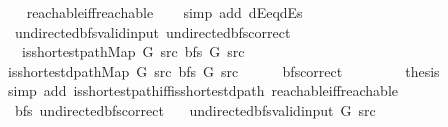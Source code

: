 \begin{isabellebody}
%
\isadelimproof
\ \ %
\endisadelimproof
%
\isatagproof
{}\isamarkupfalse%
\ reachable{\isacharunderscore}{\kern0pt}iff{\isacharunderscore}{\kern0pt}reachable\isanewline
\ \ \isamarkupfalse%
\ {\isacharparenleft}{\kern0pt}simp\ add{\isacharcolon}{\kern0pt}\ dE{\isacharunderscore}{\kern0pt}eq{\isacharunderscore}{\kern0pt}dEs{\isacharparenright}{\kern0pt}%
\endisatagproof
{\isafoldproof}%
%
\isadelimproof
\isanewline
%
\endisadelimproof
\isanewline
{}\isamarkupfalse%
\ {\isacharparenleft}{\kern0pt}\ undirected{\isacharunderscore}{\kern0pt}bfs{\isacharunderscore}{\kern0pt}valid{\isacharunderscore}{\kern0pt}input{\isacharparenright}{\kern0pt}\ undirected{\isacharunderscore}{\kern0pt}bfs{\isacharunderscore}{\kern0pt}correct{\isacharcolon}{\kern0pt}\isanewline
\ \ \ {\isachardoublequoteopen}is{\isacharunderscore}{\kern0pt}shortest{\isacharunderscore}{\kern0pt}path{\isacharunderscore}{\kern0pt}Map\ G\ src\ {\isacharparenleft}{\kern0pt}bfs\ G\ src{\isacharparenright}{\kern0pt}{\isachardoublequoteclose}\isanewline
%
\isadelimproof
%
\endisadelimproof
%
\isatagproof
{}\isamarkupfalse%
\ {\isacharminus}{\kern0pt}\isanewline
\ \ \isamarkupfalse%
\ {\isachardoublequoteopen}is{\isacharunderscore}{\kern0pt}shortest{\isacharunderscore}{\kern0pt}dpath{\isacharunderscore}{\kern0pt}Map\ G\ src\ {\isacharparenleft}{\kern0pt}bfs\ G\ src{\isacharparenright}{\kern0pt}{\isachardoublequoteclose}\isanewline
\ \ \ \ \isamarkupfalse%
\ bfs{\isacharunderscore}{\kern0pt}correct\isanewline
\ \ \ \ \isacommand{{\isachardot}{\kern0pt}}\isamarkupfalse%
\isanewline
\ \ \isamarkupfalse%
\ {\isacharquery}{\kern0pt}thesis\isanewline
\ \ \ \ \isamarkupfalse%
\ {\isacharparenleft}{\kern0pt}simp\ add{\isacharcolon}{\kern0pt}\ is{\isacharunderscore}{\kern0pt}shortest{\isacharunderscore}{\kern0pt}path{\isacharunderscore}{\kern0pt}iff{\isacharunderscore}{\kern0pt}is{\isacharunderscore}{\kern0pt}shortest{\isacharunderscore}{\kern0pt}dpath\ reachable{\isacharunderscore}{\kern0pt}iff{\isacharunderscore}{\kern0pt}reachable{\isacharparenright}{\kern0pt}\isanewline
{}\isamarkupfalse%
%
\endisatagproof
{\isafoldproof}%
%
\isadelimproof
\isanewline
%
\endisadelimproof
\isanewline
{}\isamarkupfalse%
\ {\isacharparenleft}{\kern0pt}\ bfs{\isacharparenright}{\kern0pt}\ undirected{\isacharunderscore}{\kern0pt}bfs{\isacharunderscore}{\kern0pt}correct{\isacharcolon}{\kern0pt}\isanewline
\ \ \ {\isachardoublequoteopen}undirected{\isacharunderscore}{\kern0pt}bfs{\isacharunderscore}{\kern0pt}valid{\isacharunderscore}{\kern0pt}input{\isacharprime}{\kern0pt}\ G\ src{\isachardoublequoteclose}\isanewline

\end{isabellebody}
